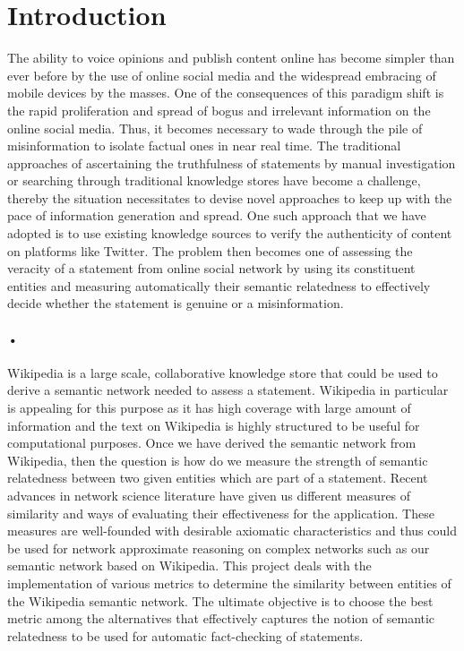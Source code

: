 \documentclass[12pt]{article}
\begin{document}
\section{Introduction}
The ability to voice opinions and publish content online has become simpler than ever before by the use of online social media and the widespread embracing of mobile devices by the masses. One of the consequences of this paradigm shift is the rapid proliferation and spread of bogus and irrelevant information on the online social media. Thus, it becomes necessary to wade through the pile of misinformation to isolate factual ones in near real time. The traditional approaches of ascertaining the truthfulness of statements by manual investigation or searching through traditional knowledge stores have become a challenge, thereby the situation necessitates to devise novel approaches to keep up with the pace of information generation and spread. One such approach that we have adopted is to use existing knowledge sources to verify the authenticity of content on platforms like Twitter. The problem then becomes one of assessing the veracity of a statement from online social network by using its constituent entities and measuring automatically their semantic relatedness to effectively decide whether the statement is genuine or a misinformation. 

\paragraph{•}
Wikipedia is a large scale, collaborative knowledge store that could be used to derive a semantic network needed to assess a statement. Wikipedia in particular is appealing for this purpose as it has high coverage with large amount of information and the text on Wikipedia is highly structured to be useful for computational purposes. Once we have derived the semantic network from Wikipedia, then the question is how do we measure the strength of semantic relatedness between two given entities which are part of a statement. Recent advances in network science literature have given us different measures of similarity and ways of evaluating their effectiveness for the application. These measures are well-founded with desirable axiomatic characteristics and thus could be used for network approximate reasoning on complex networks such as our semantic network based on Wikipedia. This project deals with the implementation of various metrics to determine the similarity between entities of the Wikipedia semantic network. The ultimate objective is to choose the best metric among the alternatives that effectively captures the notion of semantic relatedness to be used for automatic fact-checking of statements.
\end{document}
